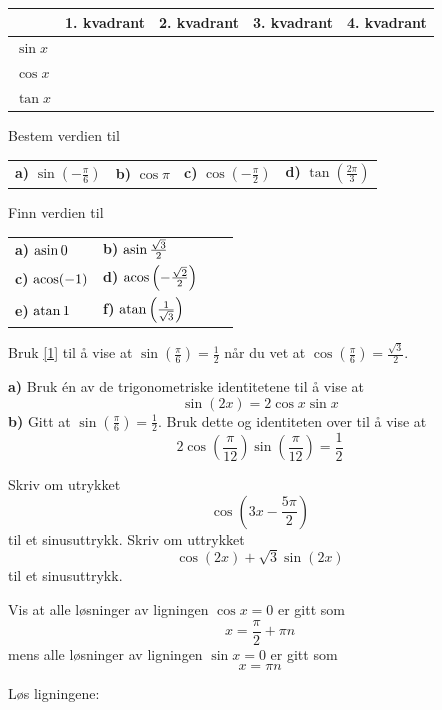 \begin{tabular}{@{}l|l| l| l|l|}
&1. kvadrant & 2. kvadrant & 3. kvadrant & 4. kvadrant\\ \hline
$ \sin x $& & & &\\ \hline
$ \cos x $& & & &\\ \hline
$ \tan x $& & & &\\\hline
\end{tabular}

Bestem verdien til\os
\begin{tabular}{@{}l l l l }
\textbf{a)} $ \sin\left(-\frac{\pi}{6}\right) $ &\quad \textbf{b)} $ \cos \pi $ &\quad \textbf{c)} $ \cos\left(-\frac{\pi}{2}\right) $&\quad \textbf{d)} $ \tan\left(\frac{2\pi}{3}\right) $
\end{tabular}

Finn verdien til\\ \renewcommand{\arraystretch}{1.7}
\begin{tabular}{@{}l l l l }	
\textbf{a)} $ \operatorname{asin} 0 $ &\quad\textbf{b)} $ \operatorname{asin} \frac{\sqrt{3}}{2} $ \\
 \textbf{c)} $ \operatorname{acos} (-1) $ &\quad\textbf{d)} $ \operatorname{acos} \left(-\frac{\sqrt{2}}{2}\right) $ \\
 \textbf{e)} $ \operatorname{atan} 1 $ &\quad\textbf{f)} $ \operatorname{atan} \left(\frac{1}{\sqrt{3}}\right) $
\end{tabular}\renewcommand{\arraystretch}{1}

Bruk \eqref{1} til å vise at $ {\sin\left(\frac{\pi}{6}\right)=\frac{1}{2}} $ når du vet at $ \cos\left(\frac{\pi}{6}\right)=\frac{\sqrt{3}}{2} $.

\textbf{a)} Bruk én av de trigonometriske identitetene til å vise at
\[  \sin (2x)=2\cos x\sin x \]
\textbf{b)} Gitt at $ {\sin \left(\frac{\pi}{6}\right)=\frac{1}{2}} $. Bruk dette og identiteten over til å vise at
\[ 2\cos \left(\frac{\pi}{12}\right)\sin \left(\frac{\pi}{12}\right) = \frac{1}{2} \]

Skriv om utrykket
\[ \cos \left(3x-\frac{5\pi}{2}\right) \]
til et sinusuttrykk.
\newpage
{}
Skriv om uttrykket \[ \cos( 2x) + \sqrt 3\sin (2x) \]
til et sinusuttrykk.

\nes

Vis at alle løsninger av ligningen $ \cos x=0 $ er gitt som
\[ x = \frac{\pi}{2}+\pi n \]
mens alle løsninger av ligningen $ \sin x = 0 $ er gitt som
\[ x = \pi n \]\vs \vs

Løs ligningene:\os

